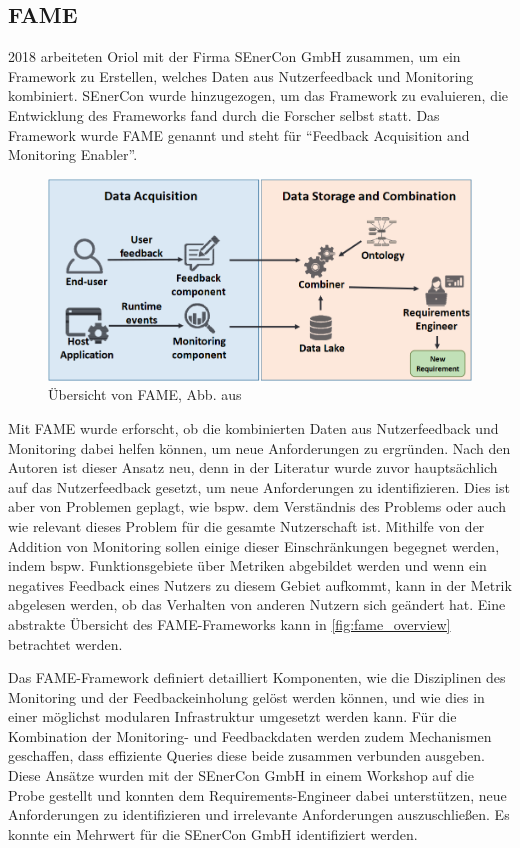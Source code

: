 \subsection{FAME}

2018 arbeiteten Oriol \etal \cite{FamePaper} mit der Firma SEnerCon GmbH zusammen, um ein Framework zu Erstellen, welches Daten aus Nutzerfeedback und Monitoring kombiniert. SEnerCon wurde hinzugezogen, um das Framework zu evaluieren, die Entwicklung des Frameworks fand durch die Forscher selbst statt. Das Framework wurde FAME genannt und steht für \enquote{Feedback Acquisition and Monitoring Enabler}.

\begin{figure}
\centering
\includegraphics[width=\linewidth]{img/03_methoden/fame_overview.png}
\caption{Übersicht von FAME, Abb. aus \cite{FamePaper}}
\label{fig:fame_overview}
\end{figure}

Mit FAME wurde erforscht, ob die kombinierten Daten aus Nutzerfeedback und Monitoring dabei helfen können, um neue Anforderungen zu ergründen. Nach den Autoren ist dieser Ansatz neu, denn in der Literatur wurde zuvor hauptsächlich auf das Nutzerfeedback gesetzt, um neue Anforderungen zu identifizieren. Dies ist aber von Problemen geplagt, wie bspw. dem Verständnis des Problems oder auch wie relevant dieses Problem für die gesamte Nutzerschaft ist. Mithilfe von der Addition von Monitoring sollen einige dieser Einschränkungen begegnet werden, indem bspw. Funktionsgebiete über Metriken abgebildet werden und wenn ein negatives Feedback eines Nutzers zu diesem Gebiet aufkommt, kann in der Metrik abgelesen werden, ob das Verhalten von anderen Nutzern sich geändert hat. Eine abstrakte Übersicht des FAME-Frameworks kann in \autoref{fig:fame_overview} betrachtet werden.

Das FAME-Framework definiert detailliert Komponenten, wie die Disziplinen des Monitoring und der Feedbackeinholung gelöst werden können, und wie dies in einer möglichst modularen Infrastruktur umgesetzt werden kann. Für die Kombination der Monitoring- und Feedbackdaten werden zudem Mechanismen geschaffen, dass effiziente Queries diese beide zusammen verbunden ausgeben. Diese Ansätze wurden mit der SEnerCon GmbH in einem Workshop auf die Probe gestellt und konnten dem Requirements-Engineer dabei unterstützen, neue Anforderungen zu identifizieren und irrelevante Anforderungen auszuschließen. Es konnte ein Mehrwert für die SEnerCon GmbH identifiziert werden.

